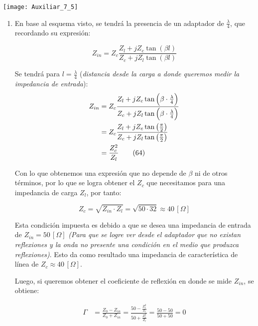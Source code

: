 \documentclass[
  11pt,
  letterpaper,
   addpoints,
   answers
  ]{exam}
\begin{document}
\begin{questions}
    \begin{center}
        \texttt{[image: Auxiliar\_7\_5]}
      \end{center}
    \begin{solution}
         \begin{enumerate}
            \item En base al esquema visto, se tendrá la presencia de un adaptador de $\frac{\lambda}{4}$, que recordando su expresión:

\begin{equation}
    Z_{in} = Z_{c} \frac{Z_{l} + jZ_{c} \tan(\beta l)}{Z_{c} + jZ_{l} \tan(\beta l)}
    \tag{63}
\end{equation}

Se tendrá para $l = \frac{\lambda}{4}$ (\textit{distancia desde la carga a donde queremos medir la impedancia de entrada}):
\begin{align}
    Z_{in} &= Z_{c} \frac{Z_{l} + jZ_{c}\tan\left( \beta \cdot \frac{\lambda}{4} \right)}{Z_{c} + jZ_{l} \tan\left( \beta \cdot \frac{\lambda}{4} \right)} \notag\\
           &= Z_{c} \frac{Z_{l} + jZ_{c}\tan\left( \frac{\pi}{2} \right)}{Z_{c} + jZ_{l} \tan\left( \frac{\pi}{2} \right)} \notag\\
           &= \frac{Z_{c}^2}{Z_{l}}
    \tag{64}
\end{align}

Con lo que obtenemos una expresión que no depende de $\beta$ ni de otros términos, por lo que se logra obtener el $Z_{c}$ que necesitamos para una impedancia de carga $Z_{l}$, por tanto:

\begin{equation}
    Z_{c} = \sqrt{Z_{in} \cdot Z_{l}} = \sqrt{50 \cdot 32} \approx 40\,[\Omega]
    \tag{65}
\end{equation}

Esta condición impuesta es debido a que se desea una impedancia de entrada de $Z_{in} = 50\,[\Omega]$ \textit{(Para que se logre ver desde el adaptador que no existan reflexiones y la onda no presente una condición en el medio que produzca reflexiones)}. Esto da como resultado una impedancia de característica de línea de $Z_{c} \approx 40\,[\Omega]$. 

Luego, si queremos obtener el coeficiente de reflexión en donde se mide $Z_{in}$, se obtiene:

\begin{align}
    \Gamma &= \frac{Z_{0} - Z_{in}}{Z_{0} + Z_{in}} = \frac{50 - \frac{Z_{c}^2}{Z_{l}}}{50 + \frac{Z_{c}^2}{Z_{l}}} = \frac{50 - 50}{50 + 50} = 0
\end{align}


\end{enumerate}
\end{solution}
\end{questions}
\end{document}
